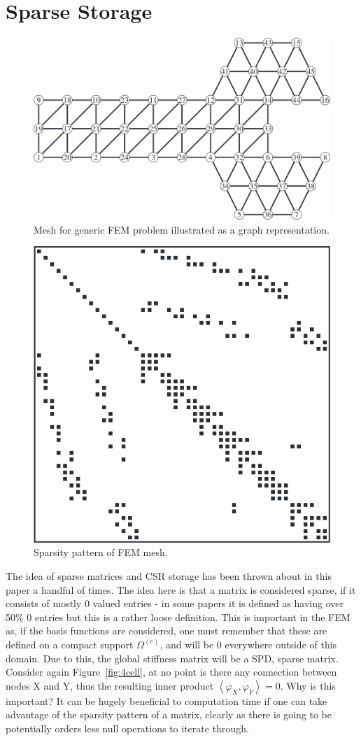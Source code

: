 \section{Sparse Storage}\label{sparse}

\begin{figure}
	\centering
	\includegraphics[width=0.7\linewidth]{Figures/mesh_graph}
	\caption{Mesh for generic FEM problem illustrated as a graph representation.}
	\label{fig:graph}
\end{figure}
\begin{figure}
	\centering
	\includegraphics[width=0.4\linewidth]{Figures/sparsity_pattern}
	\caption{Sparsity pattern of FEM mesh.}
	\label{fig:pattern}
\end{figure}

The idea of sparse matrices and CSR storage has been thrown about in this paper a handful of times. The idea here is that a matrix is considered sparse, if it consists of mostly 0 valued entries - in some papers it is defined as having over 50\% 0 entries but this is a rather loose definition. This is important in the FEM as, if the basis functions are considered, one must remember that these are defined on a compact support $\Omega^{(e)}$, and will be 0 everywhere outside of this domain. Due to this, the global stiffness matrix will be a SPD, sparse matrix. Consider again Figure~\ref{fig:4cell}, at no point is there any connection between nodes X and Y, thus the resulting inner product $\left\langle\varphi_X,\varphi_Y\right\rangle=0$. Why is this important? It can be hugely beneficial to computation time if one can take advantage of the sparsity pattern of a matrix, clearly as there is going to be potentially orders less null operations to iterate through.


